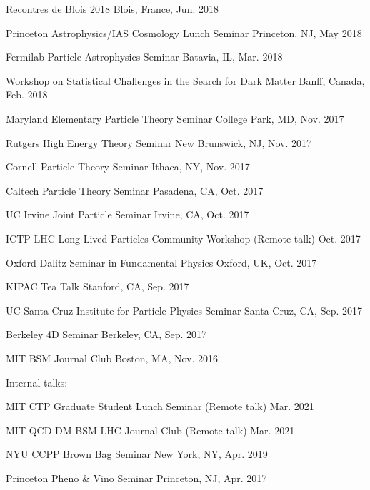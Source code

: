\documentclass[11pt]{article}
\newenvironment{packed_itemize}{
\begin{itemize}[label=\raisebox{0.25ex}{\tiny$\bullet$}]
  \setlength{\itemsep}{3pt}
  \setlength{\parskip}{0pt}
  \setlength{\parsep}{0pt}}{\end{itemize}
}
\begin{document}
\begin{packed_itemize}
  \item Recontres de Blois 2018 \hfill Blois, France, Jun. 2018
  \item Princeton Astrophysics/IAS Cosmology Lunch Seminar \hfill Princeton, NJ, May 2018
  \item Fermilab Particle Astrophysics Seminar \hfill Batavia, IL, Mar. 2018
  \item Workshop on Statistical Challenges in the Search for Dark Matter \hfill Banff, Canada, Feb. 2018
  \item Maryland Elementary Particle Theory Seminar \hfill College Park, MD, Nov. 2017
  \item Rutgers High Energy Theory Seminar \hfill New Brunswick, NJ, Nov. 2017
  \item Cornell Particle Theory Seminar \hfill Ithaca, NY, Nov. 2017
  \item Caltech Particle Theory Seminar \hfill Pasadena, CA, Oct. 2017
  \item UC Irvine Joint Particle Seminar \hfill Irvine, CA, Oct. 2017
  \item ICTP LHC Long-Lived Particles Community Workshop (Remote talk) \hfill Oct. 2017
  \item Oxford Dalitz Seminar in Fundamental Physics  \hfill Oxford, UK, Oct. 2017
  \item KIPAC Tea Talk  \hfill Stanford, CA, Sep. 2017
  \item UC Santa Cruz Institute for Particle Physics Seminar  \hfill Santa Cruz, CA, Sep. 2017
  \item Berkeley 4D Seminar  \hfill Berkeley, CA, Sep. 2017
  \item MIT BSM Journal Club \hfill Boston, MA, Nov. 2016
\end{packed_itemize}

\noindent
Internal talks:
\begin{packed_itemize}
  \item MIT CTP Graduate Student Lunch Seminar (Remote talk) \hfill Mar. 2021
  \item MIT QCD-DM-BSM-LHC Journal Club (Remote talk) \hfill Mar. 2021
  \item NYU CCPP Brown Bag Seminar \hfill New York, NY, Apr. 2019
  \item Princeton Pheno \& Vino Seminar \hfill Princeton, NJ, Apr. 2017
\end{packed_itemize}
\end{document}
